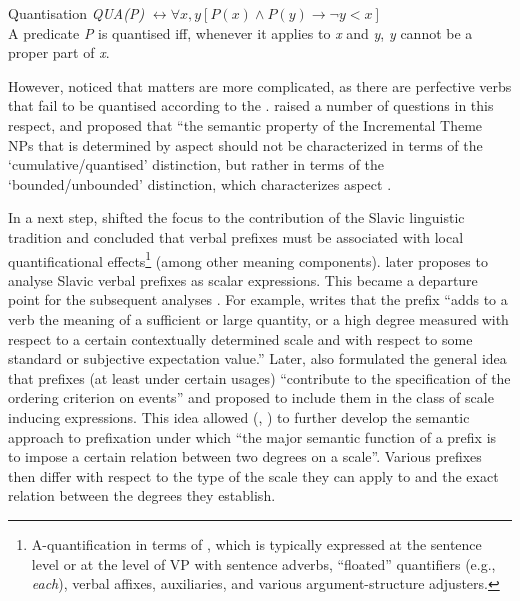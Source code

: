 \theoremstyle{definition}
\begin{definition}{Quantisation}\label{def:quant}
\textit{QUA(P)} $\leftrightarrow \forall x,y[P(x) \wedge P(y) \rightarrow \neg y<x]$\\
A predicate \textit{P} is quantised iff, whenever it applies to \textit{x} and \textit{y}, \textit{y} cannot be a proper part of \textit{x}.
\end{definition}

However, \citet{Filip:92} noticed that matters are more complicated, as there are perfective verbs that fail to be quantised according to the . \citet{Filip:92} raised a number of questions in this respect, and proposed that ``the semantic property of the Incremental Theme NPs that is determined by aspect should not be characterized in terms of the `cumulative/quantised' distinction, but rather in terms of the `bounded/unbounded' distinction, which characterizes aspect \citep[][147]{Filip:92}.

In a next step, \citet{Filip:92} shifted the focus to the contribution of the Slavic linguistic tradition \citep{Wierzbicka:67, Rassudova:75, Merrill:85} and concluded that verbal prefixes must be associated with local quantificational effects\footnote{A-quantification in terms of \citealt{BachPartee:87, BachPartee:95}, which is typically expressed at the sentence level or at the level of VP with sentence adverbs, ``floated'' quantifiers (e.g., \textit{each}), verbal affixes, auxiliaries, and various argument-structure adjusters.} (among other meaning components). \citet{Filip:99} later proposes to analyse Slavic verbal prefixes as scalar expressions. This became a departure point for the subsequent analyses \citep{Filip:00, Filip:03, Filip:05, FilipRothstein:05, Kagan:11, Kagan:12, Kagan:13, Kagan:book}. For example, \citet[183]{Filip:99} writes that the prefix  ``adds to a verb the meaning of a sufficient or large quantity, or a high degree measured with respect to a certain contextually determined scale and with respect to some standard or subjective expectation value.'' Later, \citet{Filip:08} also formulated the general idea that prefixes (at least under certain usages) ``contribute to the specification of the ordering criterion on events'' and proposed to include them in the class of scale inducing expressions. This idea allowed \citeauthor{Kagan:12} (\citeyear{Kagan:12}, \citeyear{Kagan:book}) to further develop the semantic approach to prefixation under which ``the major semantic function of a prefix is to impose a certain relation between two degrees on a scale''. Various prefixes then differ with respect to the type of the scale they can apply to and the exact relation between the degrees  they establish. 

